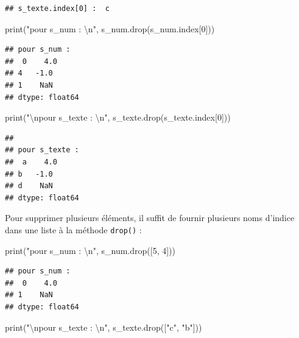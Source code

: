 \documentclass[
  12pt,
]{book}
\newenvironment{Shaded}{\begin{snugshade}}{\end{snugshade}}
\newcommand{\BuiltInTok}[1]{#1}
\newcommand{\CharTok}[1]{\textcolor[rgb]{0.31,0.60,0.02}{#1}}
\newcommand{\DecValTok}[1]{\textcolor[rgb]{0.00,0.00,0.81}{#1}}
\newcommand{\NormalTok}[1]{#1}
\newcommand{\StringTok}[1]{\textcolor[rgb]{0.31,0.60,0.02}{#1}}
\numberwithin{equation}{section}
\numberwithin{countremarque}{section}
\begin{document}
\begin{lstlisting}
## s_texte.index[0] :  c
\end{lstlisting}

\begin{Shaded}
\begin{Highlighting}[]
\BuiltInTok{print}\NormalTok{(}\StringTok{"pour s\_num : }\CharTok{\textbackslash{}n}\StringTok{"}\NormalTok{, s\_num.drop(s\_num.index[}\DecValTok{0}\NormalTok{]))}
\end{Highlighting}
\end{Shaded}

\begin{lstlisting}
## pour s_num : 
##  0    4.0
## 4   -1.0
## 1    NaN
## dtype: float64
\end{lstlisting}

\begin{Shaded}
\begin{Highlighting}[]
\BuiltInTok{print}\NormalTok{(}\StringTok{"}\CharTok{\textbackslash{}n}\StringTok{pour s\_texte : }\CharTok{\textbackslash{}n}\StringTok{"}\NormalTok{, s\_texte.drop(s\_texte.index[}\DecValTok{0}\NormalTok{]))}
\end{Highlighting}
\end{Shaded}

\begin{lstlisting}
## 
## pour s_texte : 
##  a    4.0
## b   -1.0
## d    NaN
## dtype: float64
\end{lstlisting}

Pour supprimer plusieurs éléments, il suffit de fournir plusieurs noms d'indice dans une liste à la méthode \texttt{drop()} :

\begin{Shaded}
\begin{Highlighting}[]
\BuiltInTok{print}\NormalTok{(}\StringTok{"pour s\_num : }\CharTok{\textbackslash{}n}\StringTok{"}\NormalTok{, s\_num.drop([}\DecValTok{5}\NormalTok{, }\DecValTok{4}\NormalTok{]))}
\end{Highlighting}
\end{Shaded}

\begin{lstlisting}
## pour s_num : 
##  0    4.0
## 1    NaN
## dtype: float64
\end{lstlisting}

\begin{Shaded}
\begin{Highlighting}[]
\BuiltInTok{print}\NormalTok{(}\StringTok{"}\CharTok{\textbackslash{}n}\StringTok{pour s\_texte : }\CharTok{\textbackslash{}n}\StringTok{"}\NormalTok{, s\_texte.drop([}\StringTok{"c"}\NormalTok{, }\StringTok{"b"}\NormalTok{]))}
\end{Highlighting}
\end{Shaded}
\end{document}
